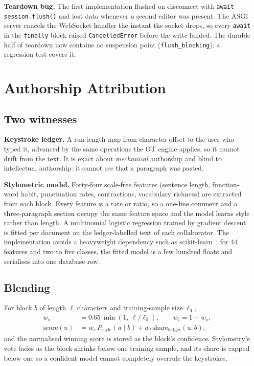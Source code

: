 \documentclass[conference]{IEEEtran}
\begin{document}
\textbf{Teardown bug.} The first implementation flushed on disconnect with \texttt{await session.flush()} and lost data whenever a second editor was present. The ASGI server cancels the WebSocket handler the instant the socket drops, so every \texttt{await} in the \texttt{finally} block raised \texttt{CancelledError} before the write landed. The durable half of teardown now contains no suspension point (\texttt{flush\_blocking}); a regression test covers it.

\section{Authorship Attribution}
\subsection{Two witnesses}
\textbf{Keystroke ledger.} A run-length map from character offset to the user who typed it, advanced by the same operations the OT engine applies, so it cannot drift from the text. It is exact about \emph{mechanical} authorship and blind to intellectual authorship: it cannot see that a paragraph was pasted.

\textbf{Stylometric model.} Forty-four scale-free features (sentence length, function-word habit, punctuation rates, contractions, vocabulary richness) are extracted from each block. Every feature is a rate or ratio, so a one-line comment and a three-paragraph section occupy the same feature space and the model learns style rather than length. A multinomial logistic regression trained by gradient descent is fitted per document on the ledger-labelled text of each collaborator. The implementation avoids a heavyweight dependency such as scikit-learn~\cite{sklearn}; for 44 features and two to five classes, the fitted model is a few hundred floats and serialises into one database row.

\subsection{Blending}
For block $b$ of length $\ell$ characters and training-sample size $\ell_0$,
\begin{align}
w_s &= 0.65\,\min\!\left(1,\ \ell/\ell_0\right), \qquad w_l = 1-w_s,\\
\mathrm{score}(u) &= w_s\,P_{\mathrm{style}}(u\mid b) + w_l\,\mathrm{share}_{\mathrm{ledger}}(u,b),
\end{align}
and the normalised winning score is stored as the block's confidence. Stylometry's vote fades as the block shrinks below one training sample, and its share is capped below one so a confident model cannot completely overrule the keystrokes.
\end{document}
